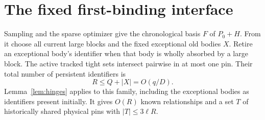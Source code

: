 \documentclass[11pt,a4paper]{article}
\theoremstyle{definition}
\theoremstyle{remark}
\begin{document}
\section{The fixed first-binding interface}
\label{sec:interface}

Sampling and the sparse optimizer give the chronological
basis $F$ of $P_0+H$. From it choose all current large
blocks and the fixed exceptional old bodies $X$.
Retire an exceptional body's identifier when that
body is wholly absorbed by a large block.
The active tracked tight sets intersect pairwise in
at most one pin. Their total number of persistent
identifiers is
\[
 R\leq Q+|X|=O(q/D).
\]
Lemma~\ref{lem:hinges} applies to this family, including
the exceptional bodies as identifiers present initially.
It gives $O(R)$ known relationships and a set $T$ of
historically shared physical pins with $|T|\leq3\ell R$.
\end{document}
